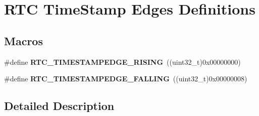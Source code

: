 \hypertarget{group___r_t_c_ex___time___stamp___edges__definitions}{}\section{R\+TC Time\+Stamp Edges Definitions}
\label{group___r_t_c_ex___time___stamp___edges__definitions}
\subsection*{Macros}
\begin{DoxyCompactItemize}
\item 
\#define {\bfseries R\+T\+C\+\_\+\+T\+I\+M\+E\+S\+T\+A\+M\+P\+E\+D\+G\+E\+\_\+\+R\+I\+S\+I\+NG}~((uint32\+\_\+t)0x00000000)\hypertarget{group___r_t_c_ex___time___stamp___edges__definitions_gaae434219f837fa77058fdbfc0a4b24d0}{}\label{group___r_t_c_ex___time___stamp___edges__definitions_gaae434219f837fa77058fdbfc0a4b24d0}

\item 
\#define {\bfseries R\+T\+C\+\_\+\+T\+I\+M\+E\+S\+T\+A\+M\+P\+E\+D\+G\+E\+\_\+\+F\+A\+L\+L\+I\+NG}~((uint32\+\_\+t)0x00000008)\hypertarget{group___r_t_c_ex___time___stamp___edges__definitions_ga5ddd88325303593d4fbaf29123037c95}{}\label{group___r_t_c_ex___time___stamp___edges__definitions_ga5ddd88325303593d4fbaf29123037c95}

\end{DoxyCompactItemize}


\subsection{Detailed Description}
